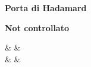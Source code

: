 \documentclass[aspectratio=169]{beamer}
\begin{document}
\begin{frame}
\begin{minipage}{0.24\textwidth}
	\end{minipage}
	\begin{minipage}{0.24\textwidth}
		\begin{center}
			\textbf{Porta di Hadamard}\\
			\vspace{10pt}
			\begin{quantikz}
			\end{quantikz}
		\end{center}
	\end{minipage}
	\begin{minipage}{0.24\textwidth}
		\begin{center}
			\textbf{Not controllato}\\
			\vspace{10pt}
			\begin{quantikz}
				\qw & \ctrl{1} & \qw \\
				\qw & \targ{} & \qw
			\end{quantikz}
		\end{center}
	\end{minipage}

\end{frame}
\end{document}
